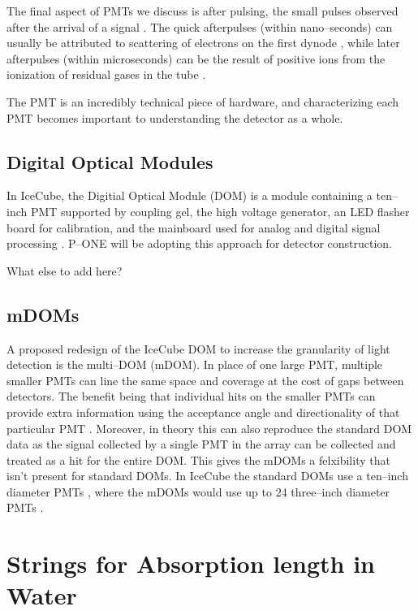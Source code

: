 The final aspect of PMTs we discuss is after pulsing, the small pulses observed after the arrival of a signal \cite{ham}. The quick afterpulses (within nano--seconds) can usually be attributed to scattering of electrons on the first dynode \cite{ham}, while later afterpulses (within microseconds) can be the result of positive ions from the ionization of residual gases in the tube \cite{ham}.

The PMT is an incredibly technical piece of hardware, and characterizing each PMT becomes important to understanding the detector as a whole. 

\subsection{Digital Optical Modules}

In IceCube, the Digitial Optical Module (DOM) is a module containing a ten--inch PMT supported by coupling gel, the high voltage generator, an LED flasher board for calibration, and the mainboard used for analog and digital signal processing \cite{icecube_pmt,icecube}. P--ONE will be adopting this approach for detector construction.

What else to add here?

\subsection{mDOMs}

A proposed redesign of the IceCube DOM to increase the granularity of light detection is the multi--DOM (mDOM). In place of one large PMT, multiple smaller PMTs can line the same space and coverage at the cost of gaps between detectors. The benefit being that individual hits on the smaller PMTs can provide extra information using the acceptance angle and directionality of that particular PMT \cite{mpmt}. Moreover, in theory this can also reproduce the standard DOM data as the signal collected by a single PMT in the array can be collected and treated as a hit for the entire DOM. This gives the mDOMs a felxibility that isn't present for standard DOMs. In IceCube the standard DOMs use a ten--inch diameter PMTs \cite{icecube}, where the mDOMs would use up to 24 three--inch diameter PMTs \cite{mpmt}.

\section{Strings for Absorption length in Water}


